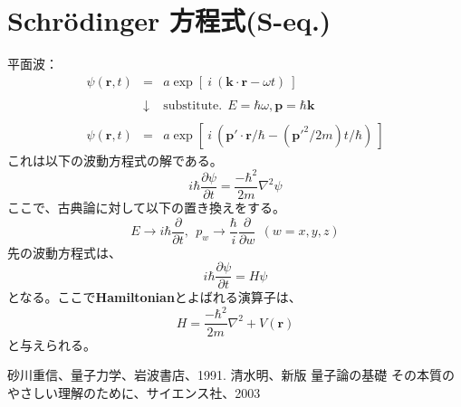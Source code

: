 \documentclass[a4j,10pt,oneside,openany]{jsbook}
\newcommand{\innerprod}[2]{\bm{#1} \cdot \bm{#2}}
\newcommand{\partialder}[2]{\frac{\partial #1}{\partial #2}}
\begin{document}
\section{Schr\"odinger 方程式(S-eq.)}
平面波：
\begin{eqnarray*}
	\psi(\bm{r},t) &=& a \exp [\ i\ (\innerprod{k}{r} - \omega t)\ ] \\ \\
	&\downarrow & \mathrm{substitute.}\ \  E=\hbar \omega, \bm{p}=\hbar\bm{k} \\ \\
	\psi(\bm{r},t) &=& a \exp [\ i\ \left( \innerprod{p'}{r}/\hbar - (\bm{p'}^2/2m) t/\hbar \right) \ ]
\end{eqnarray*}
これは以下の波動方程式の解である。
\[
	i\hbar \partialder{\psi}{t} = \frac{-\hbar^2}{2m} \nabla^2 \psi
\]
ここで、古典論に対して以下の置き換えをする。
\[
	E \rightarrow i\hbar \partialder{}{t}, \ \ p_w \rightarrow \frac{\hbar}{i} \partialder{}{w}\ \ (w = x, y, z)
\]
先の波動方程式は、
\[
	i\hbar \partialder{\psi}{t} = H\psi
\]
となる。ここで\textbf{Hamiltonian}とよばれる演算子は、
\[
	H = \frac{-\hbar^2}{2m} \nabla^2 +V(\bm{r})
\]
と与えられる。
\begin{thebibliography}{20}
  砂川重信、量子力学、岩波書店、1991.
  清水明、新版 量子論の基礎 その本質のやさしい理解のために、サイエンス社、2003
\end{thebibliography}
\newpage
\printindex
%
%
\end{document}
